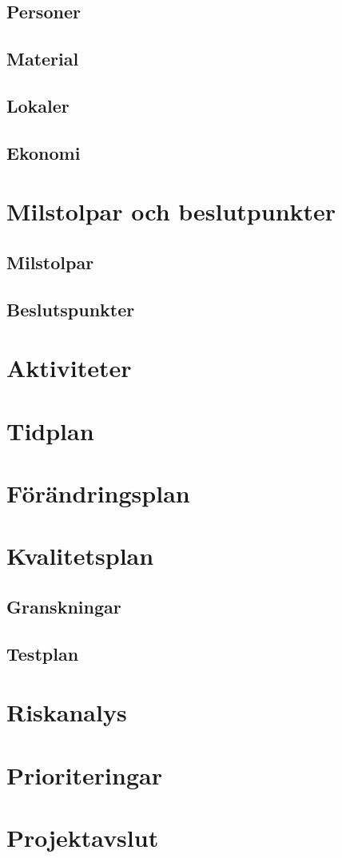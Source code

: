 \documentclass{article}
\begin{document}
\subsection{Personer}
\subsection{Material}
\subsection{Lokaler}
\subsection{Ekonomi}

\section{Milstolpar och beslutpunkter}
\subsection{Milstolpar}
\subsection{Beslutspunkter}

\section{Aktiviteter}
\section{Tidplan}
\section{Förändringsplan}
\section{Kvalitetsplan}

\subsection{Granskningar}
\subsection{Testplan}

\section{Riskanalys}
\section{Prioriteringar}
\section{Projektavslut}
\end{document}
